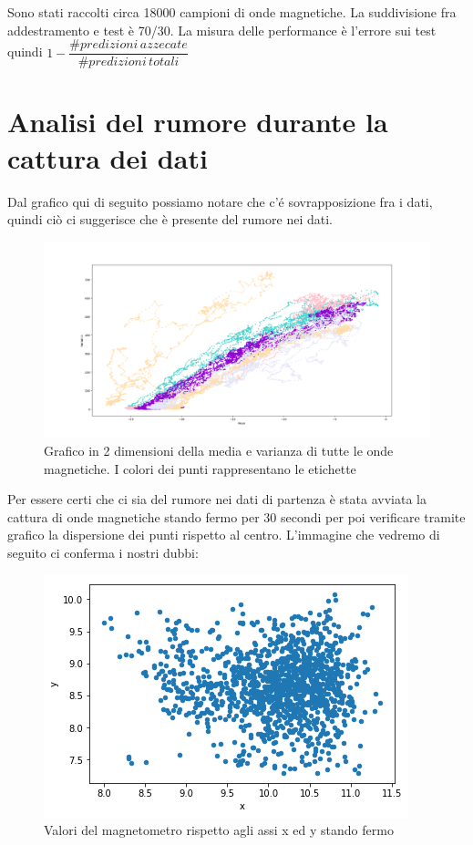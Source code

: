 Sono stati raccolti circa 18000 campioni di onde magnetiche. La suddivisione fra addestramento e test \`e 70/30. La misura delle performance \`e l'errore sui test quindi  $1 - \dfrac{\# predizioni\, azzecate}{\# predizioni\,totali}$

\section{Analisi del rumore durante la cattura dei dati}
Dal grafico qui di seguito possiamo notare che c'\'e sovrapposizione fra i dati, quindi ci\`o ci suggerisce che \`e presente del rumore nei dati.
\begin{figure}[H]
	\centering
	\includegraphics[width=1\linewidth]{img/plot_features}
	\caption{Grafico in 2 dimensioni della media e varianza di tutte le onde magnetiche. I colori dei punti rappresentano le etichette}
	\label{fig:plotfeatures}
\end{figure}



Per essere certi che ci sia del rumore nei dati di partenza \`e stata avviata la cattura di onde magnetiche stando fermo per 30 secondi per poi verificare tramite grafico la dispersione dei punti rispetto al centro. L'immagine che vedremo di seguito ci conferma i nostri dubbi:

\begin{figure}[H]
	\centering
	\includegraphics[width=0.7\linewidth]{img/xystand}
	\caption{Valori del magnetometro rispetto agli assi x ed y stando fermo}
	\label{fig:xystand}
\end{figure}

